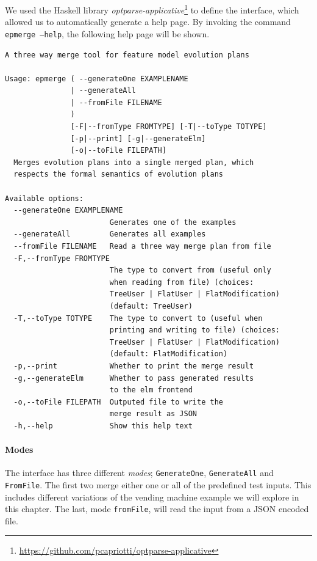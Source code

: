 \documentclass[a4paper,english]{ifimaster}
\begin{document}
We used the Haskell library \textit{optparse-applicative}\footnote{\url{https://github.com/pcapriotti/optparse-applicative}} to define the interface, which allowed us to automatically generate a help page. By invoking the command \texttt{epmerge --help}, the following help page will be shown.

\begin{verbatim}
A three way merge tool for feature model evolution plans

Usage: epmerge ( --generateOne EXAMPLENAME 
               | --generateAll 
               | --fromFile FILENAME
               )
               [-F|--fromType FROMTYPE] [-T|--toType TOTYPE] 
               [-p|--print] [-g|--generateElm] 
               [-o|--toFile FILEPATH]
  Merges evolution plans into a single merged plan, which 
  respects the formal semantics of evolution plans

Available options:
  --generateOne EXAMPLENAME
                        Generates one of the examples
  --generateAll         Generates all examples
  --fromFile FILENAME   Read a three way merge plan from file
  -F,--fromType FROMTYPE   
                        The type to convert from (useful only 
                        when reading from file) (choices: 
                        TreeUser | FlatUser | FlatModification) 
                        (default: TreeUser)
  -T,--toType TOTYPE    The type to convert to (useful when 
                        printing and writing to file) (choices: 
                        TreeUser | FlatUser | FlatModification) 
                        (default: FlatModification)
  -p,--print            Whether to print the merge result
  -g,--generateElm      Whether to pass generated results 
                        to the elm frontend
  -o,--toFile FILEPATH  Outputed file to write the 
                        merge result as JSON
  -h,--help             Show this help text
\end{verbatim}

\paragraph{Modes}%
\label{par:modes}

The interface has three different \textit{modes}; \texttt{GenerateOne}, \texttt{GenerateAll} and \texttt{FromFile}. The first two merge either one or all of the predefined test inputs. This includes different variations of the vending machine example we will explore in this chapter. The last, mode \texttt{fromFile}, will read the input from a JSON encoded file.
\end{document}
